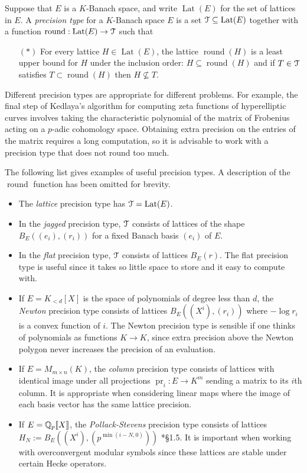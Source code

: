 \documentclass{lms}
\DeclareMathOperator{\pr}{pr}
\DeclareMathOperator{\Lat}{Lat}
\DeclareMathOperator{\round}{round}
\begin{document}
\begin{deftn}
Suppose that $E$ is a $K$-Banach space, and write $\Lat(E)$ for the set of lattices in $E$.
A \emph{precision type} for a $K$-Banach space $E$ is a set $\T \subseteq \Lat(E)$ together
with a function $\round : \Lat(E) \to \T$ such that
\begin{itemize}
\item[$(\ast)$] For every lattice $H \in \Lat(E)$, the lattice $\round(H)$ is a least upper bound for $H$ under the inclusion order:
$H \subseteq \round(H)$ and if $T \in \T$ satisfies $T \subset \round(H)$ then $H \not\subseteq T$.
\end{itemize}
\end{deftn}

Different precision types are appropriate for different problems.  For example,
the final step of Kedlaya's algorithm for computing zeta functions of hyperelliptic
curves involves taking the characteristic polynomial of the matrix of Frobenius acting
on a $p$-adic cohomology space.  Obtaining extra precision on the entries of the
matrix requires a long computation, so it is advisable to work with a precision type
that does not round too much.

The following list gives examples of useful precision types.  A description of the $\round$ function has been omitted for brevity.
\begin{itemize}
\item The \emph{lattice} precision type has $\T = \Lat(E)$.
\item In the \emph{jagged} precision type, $\T$ consists of lattices of the shape $B_E((e_i),(r_i))$ for a fixed Banach basis $(e_i)$ of $E$.
\item In the \emph{flat} precision type, $\T$ consists of lattices $B_E(r)$.  The flat precision type is useful since it takes so little space to store and it easy to compute with.
\item If $E = K_{<d}[X]$ is the space of polynomials of degree less than $d$, the \emph{Newton} precision type consists of lattices $B_E((X^i),(r_i))$ where $-\log r_i$ is a convex function of $i$.  The Newton precision type is sensible if one thinks of polynomials as functions $K \to K$, since extra precision above the Newton polygon never increases the precision of an evaluation.
\item If $E = M_{m \times n}(K)$, the \emph{column} precision type consists of lattices with identical image under all projections $\pr_i : E \to K^m$ sending a matrix to its $i$th column.  It is appropriate when considering linear maps where the image of each basis vector has the same lattice precision.
\item If $E = \mathbb Q_p \llbracket X \rrbracket$, the \emph{Pollack-Stevens} precision type consists of lattices $H_N := B_E((X^i),(p^{\min(i-N,0)}))$ \cite{pollack-stevens:11a}*{\S 1.5}.  It is important when working with overconvergent modular symbols since these lattices are stable under certain Hecke operators.
\end{itemize}
\end{document}
